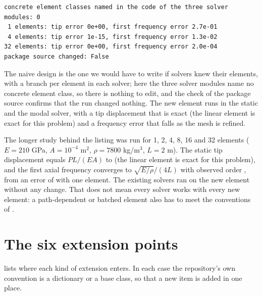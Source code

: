 \begin{lstlisting}[numbers=none,language={},keywordstyle={},commentstyle={},frame=single,aboveskip=2pt]
concrete element classes named in the code of the three solver modules: 0
 1 elements: tip error 0e+00, first frequency error 2.7e-01
 4 elements: tip error 1e-15, first frequency error 1.3e-02
32 elements: tip error 0e+00, first frequency error 2.0e-04
package source changed: False
\end{lstlisting}

The naive design is the one we would have to write if solvers knew their elements, with a branch per element in each solver; here the three solver modules name no concrete element class, so there is nothing to edit, and the check of the package source confirms that the run changed nothing. The new element runs in the static and the modal solver, with a tip displacement that is exact (the linear element is exact for this problem) and a frequency error that falls as the mesh is refined.

The longer study behind the listing was run for 1, 2, 4, 8, 16 and 32 elements ($E=210$ GPa, $A=10^{-4}$ m$^2$, $\rho=7800$ kg/m$^3$, $L=2$ m). The static tip displacement equals $PL/(EA)$ to \cdeExtStatic{} (the linear element is exact for this problem), and the first axial frequency converges to $\sqrt{E/\rho}/(4L)$ with observed order \cdeExtFreqOrder{}, from an error of \cdeExtFreqCoarse{} with one element. The existing solvers ran on the new element without any change. That does not mean every solver works with every new element: a path-dependent or batched element also has to meet the conventions of .

\section{The six extension points}\label{sec:ar-points}

 lists where each kind of extension enters. In each case the repository's own convention is a dictionary or a base class, so that a new item is added in one place.

